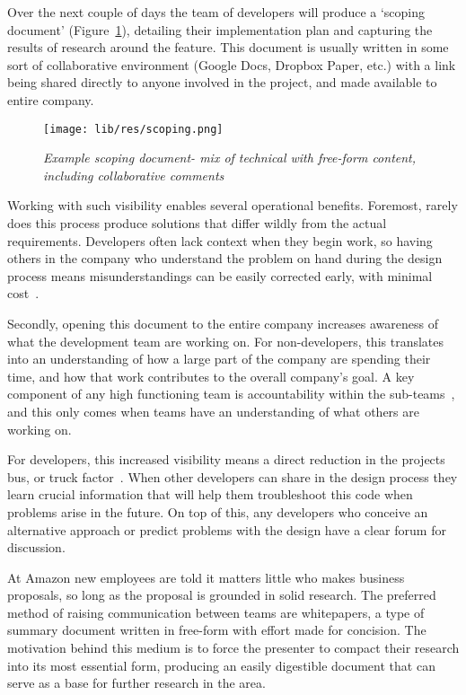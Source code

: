 \documentclass[11pt]{article}
\begin{document}
Over the next couple of days the team of developers will produce a `scoping
document' (Figure~\ref{fig:scoping}), detailing their implementation plan
and capturing the results of research around the feature. This document is
usually written in some sort of collaborative environment (Google Docs, Dropbox
Paper, etc.) with a link being shared directly to anyone involved in the
project, and made available to entire company.

\begin{figure}
\centering
\texttt{[image: lib/res/scoping.png]}
\caption{\label{fig:scoping}\textit{Example scoping document- mix of technical with
free-form content, including collaborative comments}}
\end{figure}

Working with such visibility enables several operational benefits. Foremost,
rarely does this process produce solutions that differ wildly from the actual
requirements. Developers often lack context when they begin work, so having
others in the company who understand the problem on hand during the design
process means misunderstandings can be easily corrected early, with minimal
cost~\cite{costOfChangeEssay}.

Secondly, opening this document to the entire company increases awareness of
what the development team are working on. For non-developers, this translates
into an understanding of how a large part of the company are spending their
time, and how that work contributes to the overall company's goal. A key
component of any high functioning team is accountability within the
sub-teams~\cite{fiveDysfunctions}, and this only comes when teams have an
understanding of what others are working on.

For developers, this increased visibility means a direct reduction in the
projects bus, or truck factor~\cite{truckFactor}. When other developers can share
in the design process they learn crucial information that will help them
troubleshoot this code when problems arise in the future. On top of this, any
developers who conceive an alternative approach or predict problems with the
design have a clear forum for discussion.

At Amazon new employees are told it matters little who makes business proposals,
so long as the proposal is grounded in solid research. The preferred method of
raising communication between teams are whitepapers, a type of summary document
written in free-form with effort made for concision. The motivation behind this
medium is to force the presenter to compact their research into its most
essential form, producing an easily digestible document that can serve as a base
for further research in the area.
\end{document}
